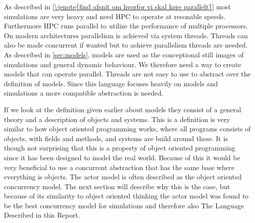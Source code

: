 As described in \cref{\jenote{find afsnit om hvorfor vi skal køre parallelt}} most simulations are very heavy and need HPC to operate at resonable speeds. Furthermore HPC runs parallel to utilize the performance of multiple processors. On modern architectures parallelism is achieved via system threads. Threads can also be made concurrent if wanted but to achieve parallelism threads are needed. As described in \cref{sec:models}, models are used as the conceptional still images of simulations and general dynamic behaviour.  We therefore need a way to create models that can operate parallel. Threads are not easy to use to abstract over the definition of models. Since this language focuses heavily on models and simulations a more compatible abstraction is needed.

If we look at the definition given earlier about models they consist of a general theory and a description of objects and systems. This is a definition is very similar to how object oriented programming works, where all programs consists of objects, with fields and methods, and systems are build around these. It is though not surprising that this is a property of object oriented programming since it has been designed to model the real world.
Because of this it would be very beneficial to use a concurrent abstraction that has the same base where everything is objects.
The actor model is often described as the object oriented concurrency model. The next section will describe why this is the case, but because of its similarity to object oriented thinking the actor model was found to be the best concurrency model for simulations and therefore also The Language Described in this Report.